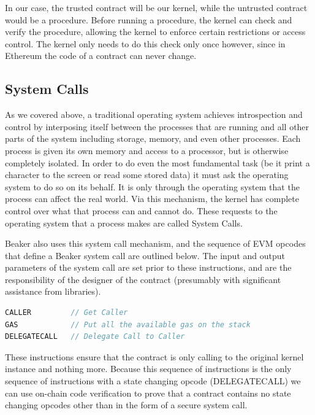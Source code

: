 \documentclass[english,a4paper]{article}
\begin{document}
In our case, the trusted contract will be our kernel, while the
untrusted contract would be a procedure. Before running a procedure, the
kernel can check and verify the procedure, allowing the kernel to
enforce certain restrictions or access control. The kernel only needs to
do this check only once however, since in Ethereum the code of a
contract can never change.

\subsection{System Calls}\label{system-calls}
As we covered above, a traditional operating system achieves
introspection and control by interposing itself between the processes
that are running and all other parts of the system including storage,
memory, and even other processes. Each process is given its own memory
and access to a processor, but is otherwise completely isolated. In
order to do even the most fundamental task (be it print a character to
the screen or read some stored data) it must ask the operating system to
do so on its behalf. It is only through the operating system that the
process can affect the real world. Via this mechanism, the kernel has
complete control over what that process can and cannot do. These
requests to the operating system that a process makes are called System
Calls.

Beaker also uses this system call mechanism, and the sequence of EVM opcodes
that define a Beaker system call are outlined below. The input and output
parameters of the system call are set prior to these instructions, and are the
responsibility of the designer of the contract (presumably with significant
assistance from libraries).




\begin{minipage}{\linewidth}
\begin{lstlisting}[language=c,commentstyle=\color{mygreen},basicstyle=\ttfamily,identifierstyle=\color{blue},caption=Sequence of steps to perform a system call.]
CALLER         // Get Caller
GAS            // Put all the available gas on the stack
DELEGATECALL   // Delegate Call to Caller
\end{lstlisting}
\end{minipage}

These instructions ensure that the contract is only calling to the
original kernel instance and nothing more. Because this sequence of
instructions is the only sequence of instructions with a state changing
opcode (DELEGATECALL) we can use on-chain code verification to prove
that a contract contains no state changing opcodes other than in the
form of a secure system call.
\end{document}
